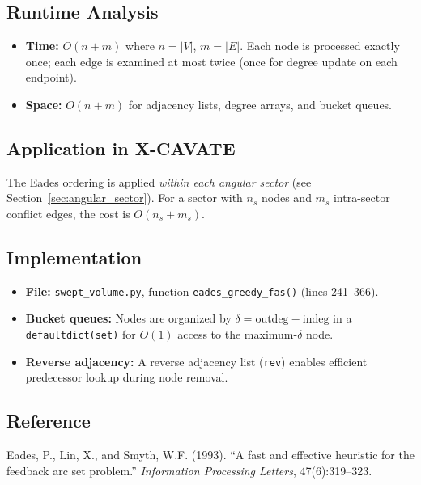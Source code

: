 \documentclass[11pt,a4paper]{article}
\newcommand{\Oh}[1]{$O(#1)$}
\newcommand{\filename}[1]{\texttt{\textcolor{accentblue}{#1}}}
\newcommand{\funcname}[1]{\texttt{\textcolor{codepurple}{#1}}}
\begin{document}
\subsection{Runtime Analysis}

\begin{itemize}[nosep]
    \item \textbf{Time:} \Oh{n + m} where $n = |V|$, $m = |E|$. Each node is processed exactly once; each edge is examined at most twice (once for degree update on each endpoint).
    \item \textbf{Space:} \Oh{n + m} for adjacency lists, degree arrays, and bucket queues.
\end{itemize}

\subsection{Application in X-CAVATE}

The Eades ordering is applied \emph{within each angular sector} (see Section~\ref{sec:angular_sector}). For a sector with $n_s$ nodes and $m_s$ intra-sector conflict edges, the cost is \Oh{n_s + m_s}.

\subsection{Implementation}

\begin{itemize}[nosep]
    \item \textbf{File:} \filename{swept\_volume.py}, function \funcname{eades\_greedy\_fas()} (lines 241--366).
    \item \textbf{Bucket queues:} Nodes are organized by $\delta = \text{outdeg} - \text{indeg}$ in a \texttt{defaultdict(set)} for \Oh{1} access to the maximum-$\delta$ node.
    \item \textbf{Reverse adjacency:} A reverse adjacency list (\texttt{rev}) enables efficient predecessor lookup during node removal.
\end{itemize}

\subsection{Reference}

Eades, P., Lin, X., and Smyth, W.F. (1993). ``A fast and effective heuristic for the feedback arc set problem.'' \textit{Information Processing Letters}, 47(6):319--323.


\end{document}

